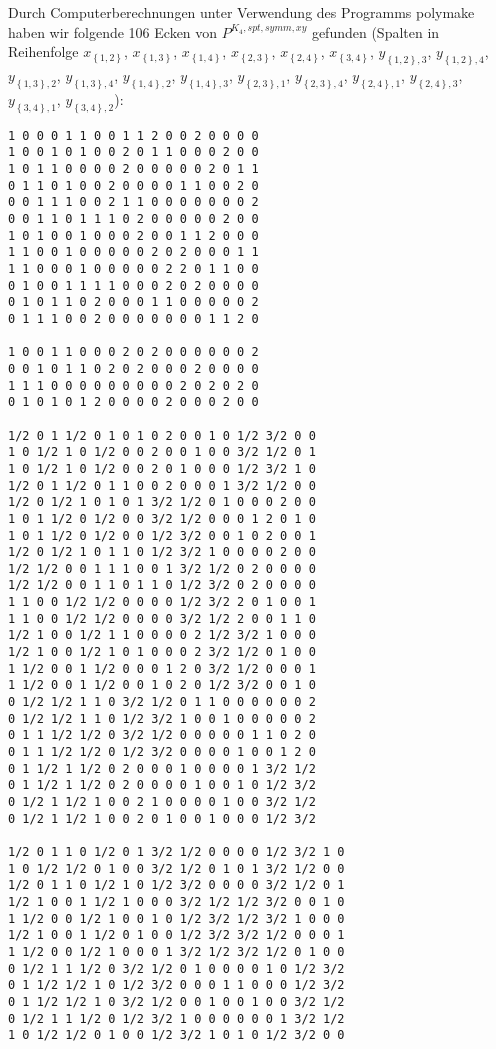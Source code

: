 \documentclass[10p,a4paper,BCOR = 12mm, DIV=15]{scrbook}
\begin{document}
\label{sec:ergebnis_computerberechnungen}

Durch Computerberechnungen unter Verwendung des Programms polymake \cite{polymake} haben wir folgende 106 Ecken von $P^{K_4, spt, symm, xy}$ gefunden (Spalten in Reihenfolge $x_{\left\{1, 2\right\}}$, $x_{\left\{1, 3\right\}}$, $x_{\left\{1, 4\right\}}$, $x_{\left\{2, 3\right\}}$, $x_{\left\{2, 4\right\}}$, $x_{\left\{3, 4\right\}}$, $y_{\left\{1, 2\right\}, 3}$, $y_{\left\{1, 2\right\}, 4}$, $y_{\left\{1, 3\right\}, 2}$, $y_{\left\{1, 3\right\}, 4}$, $y_{\left\{1, 4\right\}, 2}$, $y_{\left\{1, 4\right\}, 3}$, $y_{\left\{2, 3\right\}, 1}$, $y_{\left\{2, 3\right\}, 4}$, $y_{\left\{2, 4\right\}, 1}$, $y_{\left\{2, 4\right\}, 3}$, $y_{\left\{3, 4\right\}, 1}$, $y_{\left\{3, 4\right\}, 2}$):
\begin{verbatim}
1 0 0 0 1 1 0 0 1 1 2 0 0 2 0 0 0 0
1 0 0 1 0 1 0 0 2 0 1 1 0 0 0 2 0 0
1 0 1 1 0 0 0 0 2 0 0 0 0 0 2 0 1 1
0 1 1 0 1 0 0 2 0 0 0 0 1 1 0 0 2 0
0 0 1 1 1 0 0 2 1 1 0 0 0 0 0 0 0 2
0 0 1 1 0 1 1 1 0 2 0 0 0 0 0 2 0 0
1 0 1 0 0 1 0 0 0 2 0 0 1 1 2 0 0 0
1 1 0 0 1 0 0 0 0 0 2 0 2 0 0 0 1 1
1 1 0 0 0 1 0 0 0 0 0 2 2 0 1 1 0 0
0 1 0 0 1 1 1 1 0 0 0 2 0 2 0 0 0 0
0 1 0 1 1 0 2 0 0 0 1 1 0 0 0 0 0 2
0 1 1 1 0 0 2 0 0 0 0 0 0 0 1 1 2 0

1 0 0 1 1 0 0 0 2 0 2 0 0 0 0 0 0 2
0 0 1 0 1 1 0 2 0 2 0 0 0 2 0 0 0 0
1 1 1 0 0 0 0 0 0 0 0 0 2 0 2 0 2 0
0 1 0 1 0 1 2 0 0 0 0 2 0 0 0 2 0 0

1/2 0 1 1/2 0 1 0 1 0 2 0 0 1 0 1/2 3/2 0 0
1 0 1/2 1 0 1/2 0 0 2 0 0 1 0 0 3/2 1/2 0 1
1 0 1/2 1 0 1/2 0 0 2 0 1 0 0 0 1/2 3/2 1 0
1/2 0 1 1/2 0 1 1 0 0 2 0 0 0 1 3/2 1/2 0 0
1/2 0 1/2 1 0 1 0 1 3/2 1/2 0 1 0 0 0 2 0 0
1 0 1 1/2 0 1/2 0 0 3/2 1/2 0 0 0 1 2 0 1 0
1 0 1 1/2 0 1/2 0 0 1/2 3/2 0 0 1 0 2 0 0 1
1/2 0 1/2 1 0 1 1 0 1/2 3/2 1 0 0 0 0 2 0 0
1/2 1/2 0 0 1 1 1 0 0 1 3/2 1/2 0 2 0 0 0 0
1/2 1/2 0 0 1 1 0 1 1 0 1/2 3/2 0 2 0 0 0 0
1 1 0 0 1/2 1/2 0 0 0 0 1/2 3/2 2 0 1 0 0 1
1 1 0 0 1/2 1/2 0 0 0 0 3/2 1/2 2 0 0 1 1 0
1/2 1 0 0 1/2 1 1 0 0 0 0 2 1/2 3/2 1 0 0 0
1/2 1 0 0 1/2 1 0 1 0 0 0 2 3/2 1/2 0 1 0 0
1 1/2 0 0 1 1/2 0 0 0 1 2 0 3/2 1/2 0 0 0 1
1 1/2 0 0 1 1/2 0 0 1 0 2 0 1/2 3/2 0 0 1 0
0 1/2 1/2 1 1 0 3/2 1/2 0 1 1 0 0 0 0 0 0 2
0 1/2 1/2 1 1 0 1/2 3/2 1 0 0 1 0 0 0 0 0 2
0 1 1 1/2 1/2 0 3/2 1/2 0 0 0 0 0 1 1 0 2 0
0 1 1 1/2 1/2 0 1/2 3/2 0 0 0 0 1 0 0 1 2 0
0 1 1/2 1 1/2 0 2 0 0 0 1 0 0 0 0 1 3/2 1/2
0 1 1/2 1 1/2 0 2 0 0 0 0 1 0 0 1 0 1/2 3/2
0 1/2 1 1/2 1 0 0 2 1 0 0 0 0 1 0 0 3/2 1/2
0 1/2 1 1/2 1 0 0 2 0 1 0 0 1 0 0 0 1/2 3/2

1/2 0 1 1 0 1/2 0 1 3/2 1/2 0 0 0 0 1/2 3/2 1 0
1 0 1/2 1/2 0 1 0 0 3/2 1/2 0 1 0 1 3/2 1/2 0 0
1/2 0 1 1 0 1/2 1 0 1/2 3/2 0 0 0 0 3/2 1/2 0 1
1/2 1 0 0 1 1/2 1 0 0 0 3/2 1/2 1/2 3/2 0 0 1 0
1 1/2 0 0 1/2 1 0 0 1 0 1/2 3/2 1/2 3/2 1 0 0 0
1/2 1 0 0 1 1/2 0 1 0 0 1/2 3/2 3/2 1/2 0 0 0 1
1 1/2 0 0 1/2 1 0 0 0 1 3/2 1/2 3/2 1/2 0 1 0 0
0 1/2 1 1 1/2 0 3/2 1/2 0 1 0 0 0 0 1 0 1/2 3/2
0 1 1/2 1/2 1 0 1/2 3/2 0 0 0 1 1 0 0 0 1/2 3/2
0 1 1/2 1/2 1 0 3/2 1/2 0 0 1 0 0 1 0 0 3/2 1/2
0 1/2 1 1 1/2 0 1/2 3/2 1 0 0 0 0 0 0 1 3/2 1/2
1 0 1/2 1/2 0 1 0 0 1/2 3/2 1 0 1 0 1/2 3/2 0 0


\end{verbatim}
\end{document}
